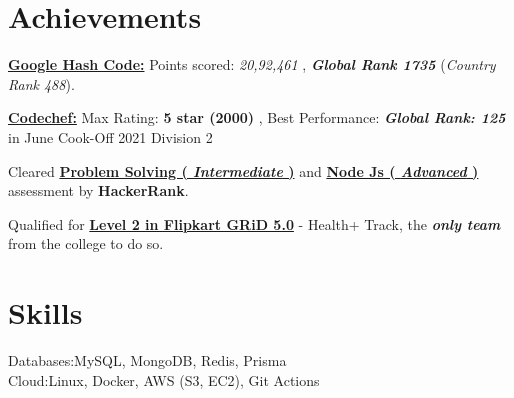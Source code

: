 \documentclass[]{resume-openfont}
\begin{document}
\section{Achievements}
\begin{bullets}
    \item  \textbf{\href{https://drive.google.com/file/d/1PHLWF7olshOeVYCrIPq_-AS-QvxKBV9m/view?usp=sharing}{Google Hash Code:}} Points scored: \textit{20,92,461} , \textbf{\textit{ Global Rank 1735}} (\textit{Country Rank 488}).
    \item  \textbf{\href{https://www.codechef.com/users/mrsayan/}{Codechef:}} Max Rating: \textbf{5 star (2000)} , Best Performance: \textbf{\textit{Global Rank: 125}} in June Cook-Off 2021 Division 2
    \item Cleared \textbf{\href{https://www.hackerrank.com/certificates/4099d9ae927f}{Problem Solving ( \textit{Intermediate} )}} and \textbf{\href{https://www.hackerrank.com/certificates/5ce743e1535f}{Node Js ( \textit{Advanced} )}} assessment by \textbf{HackerRank}.
    \item 
    Qualified for \textbf{\href{https://drive.google.com/file/d/1nG47kEjyQut83Ep9Tz-li2tB_1fTugOQ/view?usp=sharing}{Level 2 in Flipkart GRiD 5.0}} - Health+ Track, the \textbf{\textit{only team}} from the college to do so.
\end{bullets}
\sectionsep

\section{Skills}

\begin{skillList}
    {Databases:}{MySQL, MongoDB, Redis, Prisma}
    \\
    {Cloud:}{Linux, Docker, AWS (S3, EC2), Git Actions}%
    \\
    
\end{skillList}
\end{document}
